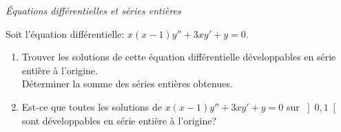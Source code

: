\documentclass[a4paper,10pt]{report}
\begin{document}
\medskip

\begin{center}
\textit{{ {\large Équations différentielles et séries entières}}}
\end{center}

\medskip

\begin{Exercice}{} Soit l'équation différentielle: $x(x-1)y''+3xy'+y=0$.
\begin{enumerate}
\item Trouver les solutions de cette équation différentielle développables en série entière à l'origine.\\ Déterminer la somme des séries entières obtenues.

\item 
Est-ce que toutes les solutions de $x(x-1)y''+3xy'+y=0$ sur $\left]0,1 \right[$ sont développables en série entière à l'origine? 
\end{enumerate}
\end{Exercice}
\end{document}
